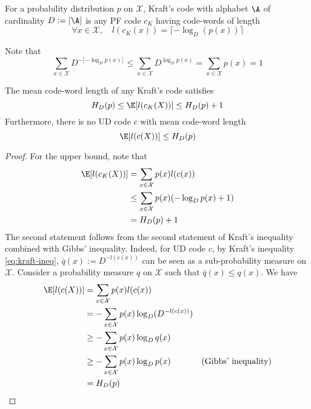 \documentclass{../cs-classes/cs-classes}
\newcommand*{\X}{\mathcal{X}}
\begin{document}
\begin{definition}
    For a probability distribution $p$ on $\X$, Kraft's code with alphabet $\A$ of cardinality $D:=|\A|$ is any PF code $c_K$ having code-words of length
    \begin{equation*}
        \forall x\in \X, \quad l(c_K(x))=\lceil -\log_D(p(x))\rceil
    \end{equation*}
\end{definition}

\begin{remark}
    Note that
    \begin{equation*}
        \sum_{x\in\X}D^{-\lceil-\log_Dp(x)\rceil}\leq \sum_{x\in\X}D^{\log_Dp(x)}=\sum_{x\in\X}p(x)=1
    \end{equation*}
\end{remark}

\begin{property}
    The mean code-word length of any Kraft's code satisfies
    \begin{equation}
        \label{eq:mean-length-kraft}
        H_D(p)\leq \E[l(c_K(X))]\leq H_D(p)+1
    \end{equation}
    Furthermore, there is no UD code $c$ with mean code-word length
    \begin{equation*}
        \E[l(c(X))]\leq H_D(p)
    \end{equation*}
\end{property}

\begin{proof}
    For the upper bound, note that
    \begin{equation*}
        \begin{aligned}
            \E[l(c_K(X))]&=\sum_{x\in\X}p(x)l(c(x))\\
            &\leq \sum_{x\in\X}p(x)(-\log_Dp(x)+1)\\
            &= H_D(p)+1
        \end{aligned}
    \end{equation*}
    The second statement follows from the second statement of Kraft's inequality combined with Gibbs' inequality. Indeed, for UD code $c$, by Kraft's inequality \eqref{eq:kraft-ineq}, $\bar{q}(x):=D^{-l(c(x))}$ can be seen as a sub-probability measure on $\X$. Consider a probability measure $q$ on $\X$ such that $\bar{q}(x)\leq q(x)$. We have
    \begin{equation*}
        \begin{aligned}
            \E[l(c(X))] &= \sum_{x\in\X}p(x)l(c(x))\\
            &= -\sum_{x\in\X}p(x)\log_D(D^{-l(c(x))})\\
            &\geq -\sum_{x\in\X}p(x)\log_Dq(x)\\
            &\geq -\sum_{x\in\X}p(x)\log_Dp(x) & \textnormal{(Gibbs' inequality)}\\
            &= H_D(p)
        \end{aligned}
    \end{equation*}
\end{proof}
\end{document}
